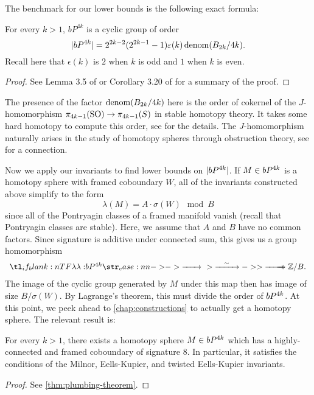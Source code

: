 The benchmark for our lower bounds is the following exact formula:
\begin{theorem}\label{thm:kervaire-milnor}
	For every $k>1$, $bP^{4k}$ is a cyclic group of order
	\[
		|bP^{4k}| =2^{2k-2}(2^{2k-1}-1)\varepsilon(k)\operatorname{denom}(B_{2k}/4k).
	\]
	Recall here that $\epsilon(k)$ is $2$ when $k$ is odd and $1$ when $k$ is even.
\end{theorem}
\begin{proof}
	See Lemma 3.5 of \cite{milnor1958manifolds} or Corollary 3.20 of \cite{levine1985lectures} for a summary of the proof.
\end{proof}

\begin{remark*}
	The presence of the factor $\operatorname{denom}(B_{2k}/4k)$ here is the order of cokernel of the $J$-homomorphism $\pi_{4k-1}(\mathrm{SO}) \to \pi_{4k-1}(S)$ in stable homotopy theory. It takes some hard homotopy to compute this order, see \cite{adams1966J} for the details. The $J$-homomorphism naturally arises in the study of homotopy spheres through obstruction theory, see \cite{milnorkervaire1960bernoulli} for a connection.
\end{remark*}

Now we apply our invariants to find lower bounds on $|bP^{4k}|$. If $M\in bP^{4k}$ is a homotopy sphere with framed coboundary $W$, all of the invariants constructed above simplify to the form
\[
		\lambda(M) = A\cdot \sigma(W) \mod B
\]
since all of the Pontryagin classes of a framed manifold vanish (recall that Pontryagin classes are stable). Here, we assume that $A$ and $B$ have no common factors. Since signature is additive under connected sum, this gives us a group homomorphism
\[
	\lkxfunc{\lambda}{\bP^{4k}}{\Z/B.}
\]
The image of the cyclic group generated by $M$ under this map then has image of size $B/\sigma(W)$. By Lagrange's theorem, this must divide the order of $bP^{4k}$. At this point, we peek ahead to \cref{chap:constructions} to actually get a homotopy sphere. The relevant result is:

\begin{proposition}
	For every $k>1$, there exists a homotopy sphere $M\in bP^{4k}$ which has a highly-connected and framed coboundary of signature 8. In particular, it satisfies the conditions of the Milnor, Eells-Kupier, and twisted Eells-Kupier invariants.
\end{proposition}
\begin{proof}
	See \cref{thm:plumbing-theorem}.
\end{proof}


